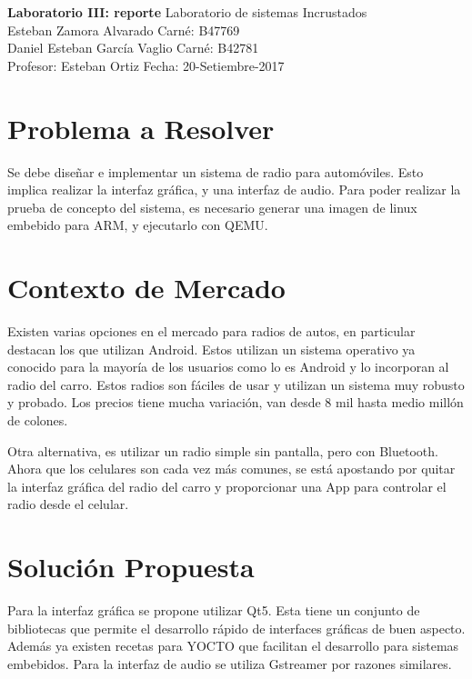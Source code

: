 

\noindent
\large\textbf{Laboratorio III: reporte} \hfill Laboratorio de sistemas Incrustados \\
\normalsize Esteban Zamora Alvarado \hfill Carné: B47769 \\
Daniel Esteban García Vaglio \hfill Carné: B42781 \\
Profesor: Esteban Ortiz  \hfill Fecha: 20-Setiembre-2017 \\

\section{Problema a Resolver}
\label{sec:Problem}
Se debe diseñar e implementar un sistema de radio para automóviles. Esto implica realizar la
interfaz gráfica, y una interfaz de audio. Para poder realizar la prueba de concepto del sistema, es
necesario generar una imagen de linux embebido para ARM, y ejecutarlo con QEMU. 

\section{Contexto de Mercado}
\label{sec:Context}
Existen varias opciones en el mercado para radios de autos, en particular destacan los que utilizan
Android. Estos utilizan un sistema operativo ya conocido para la mayoría de los usuarios como lo es
Android y lo incorporan al radio del carro. Estos radios son fáciles de usar y utilizan un sistema
muy robusto y probado. Los precios tiene mucha variación, van desde 8 mil hasta medio millón de
colones.

Otra alternativa, es utilizar un radio simple sin pantalla, pero con Bluetooth. Ahora que los
celulares son cada vez más comunes, se está apostando por quitar la interfaz gráfica del radio del
carro y proporcionar una App para controlar el radio desde el celular.  


\section{Solución Propuesta}
\label{sec:solution}
Para la interfaz gráfica se propone utilizar Qt5. Esta tiene un conjunto de bibliotecas que permite
el desarrollo rápido de interfaces gráficas de buen aspecto. Además ya existen recetas para YOCTO
que facilitan el desarrollo para sistemas embebidos. Para la interfaz de audio se utiliza Gstreamer
por razones similares.

